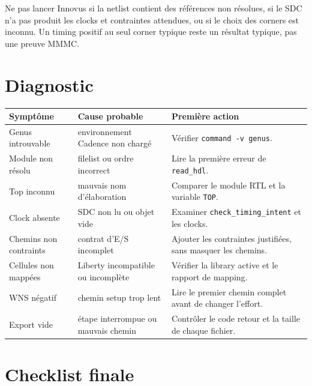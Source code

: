 \documentclass[11pt,a4paper,openany]{report}
\begin{document}
\begin{failurebox}
Ne pas lancer Innovus si la netlist contient des références non résolues, si
le SDC n'a pas produit les clocks et contraintes attendues, ou si le choix des
corners est inconnu. Un timing positif au seul corner typique reste un résultat
typique, pas une preuve MMMC.
\end{failurebox}

\chapter{Diagnostic}

\begin{longtable}{p{}p{}p{}}
\toprule
Symptôme & Cause probable & Première action \\
\midrule
Genus introuvable & environnement Cadence non chargé &
Vérifier \texttt{command -v genus}. \\
Module non résolu & filelist ou ordre incorrect &
Lire la première erreur de \texttt{read\_hdl}. \\
Top inconnu & mauvais nom d'élaboration &
Comparer le module RTL et la variable \texttt{TOP}. \\
Clock absente & SDC non lu ou objet vide &
Examiner \texttt{check\_timing\_intent} et les clocks. \\
Chemins non contraints & contrat d'E/S incomplet &
Ajouter les contraintes justifiées, sans masquer les chemins. \\
Cellules non mappées & Liberty incompatible ou incomplète &
Vérifier la library active et le rapport de mapping. \\
WNS négatif & chemin setup trop lent &
Lire le premier chemin complet avant de changer l'effort. \\
Export vide & étape interrompue ou mauvais chemin &
Contrôler le code retour et la taille de chaque fichier. \\
\bottomrule
\end{longtable}

\appendix
\chapter{Checklist finale}
\end{document}

